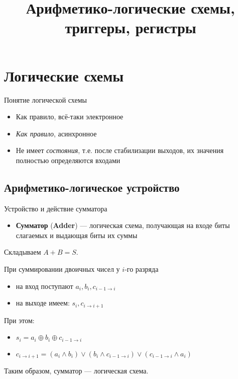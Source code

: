 \documentclass[xetex,aspectratio=43]{beamer}
\title[Триггеры и логика]{Арифметико-логические схемы, триггеры, регистры}
\begin{document}
    \titleslide

    \tocslide

\section{Логические схемы}

\begin{frame}{Понятие логической схемы}
    \pause
    \begin{itemize}
        \item Как правило, всё-таки электронное
        \item \emph{Как правило}, асинхронное
        \item Не имеет \emph{состояния}, т.е. после стабилизации выходов, их значения полностью определяются входами
    \end{itemize}
\end{frame}

\subsection{Арифметико-логическое устройство}

\begin{frame}{Устройство и действие сумматора}
    \begin{itemize}
        \tightlist
        \item
        \textbf{Сумматор} (\textbf{Adder}) --- логическая схема, получающая на
        входе биты слагаемых и выдающая биты их суммы
    \end{itemize}

    Складываем \(A+B=S\).

    При суммировании двоичных чисел у \(i\)-го разряда

    \begin{itemize}
        \tightlist
        \item
        на вход поступают \(a_i, b_i, c_{i-1 \rightarrow i}\)
        \item
        на выходе имеем: \(s_i, c_{i \rightarrow i+1}\)
    \end{itemize}

    При этом:

    \begin{itemize}
        \tightlist
        \item
        \(s_i = a_i \oplus b_i \oplus c_{i-1 \rightarrow i}\)
        \item
        \(c_{i \rightarrow i+1} = (a_i \land b_i) \lor (b_i \land c_{i-1 \rightarrow i}) \lor (c_{i-1 \rightarrow i} \land a_i)\)
    \end{itemize}

    Таким образом, сумматор --- логическая схема.
\end{frame}
\end{document}
